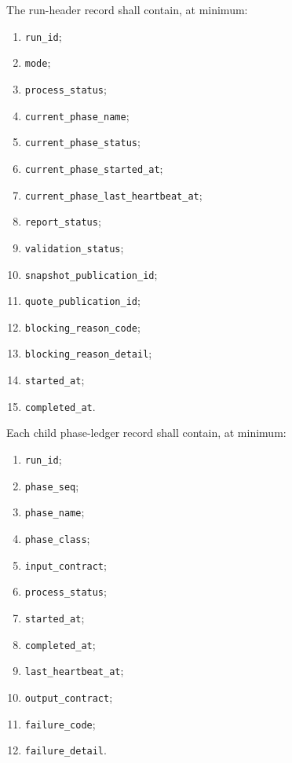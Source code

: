 \documentclass[11pt]{report}
\begin{document}
The run-header record shall contain, at minimum:
\begin{enumerate}[leftmargin=1.2cm]
    \item \texttt{run\_id};
    \item \texttt{mode};
    \item \texttt{process\_status};
    \item \texttt{current\_phase\_name};
    \item \texttt{current\_phase\_status};
    \item \texttt{current\_phase\_started\_at};
    \item \texttt{current\_phase\_last\_heartbeat\_at};
    \item \texttt{report\_status};
    \item \texttt{validation\_status};
    \item \texttt{snapshot\_publication\_id};
    \item \texttt{quote\_publication\_id};
    \item \texttt{blocking\_reason\_code};
    \item \texttt{blocking\_reason\_detail};
    \item \texttt{started\_at};
    \item \texttt{completed\_at}.
\end{enumerate}

Each child phase-ledger record shall contain, at minimum:
\begin{enumerate}[leftmargin=1.2cm]
    \item \texttt{run\_id};
    \item \texttt{phase\_seq};
    \item \texttt{phase\_name};
    \item \texttt{phase\_class};
    \item \texttt{input\_contract};
    \item \texttt{process\_status};
    \item \texttt{started\_at};
    \item \texttt{completed\_at};
    \item \texttt{last\_heartbeat\_at};
    \item \texttt{output\_contract};
    \item \texttt{failure\_code};
    \item \texttt{failure\_detail}.
\end{enumerate}
\end{document}

